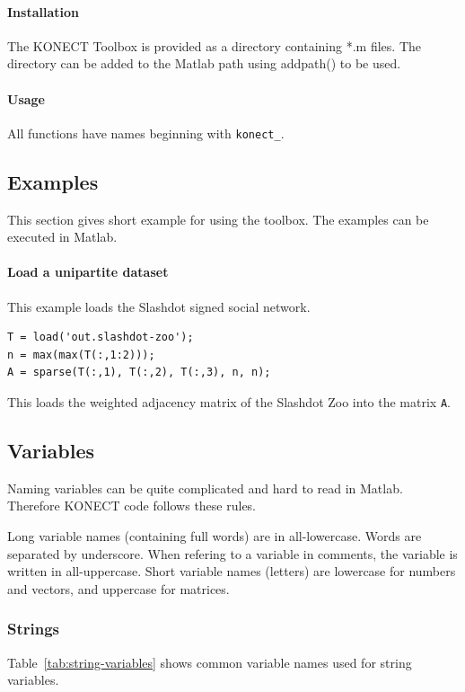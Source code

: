 \documentclass{article}
\begin{document}
\paragraph{Installation}
The KONECT Toolbox is provided as a directory containing *.m files.  The
directory can be added to the Matlab path using addpath() to be used.

\paragraph{Usage}
All functions have names beginning with \texttt{konect\_}.

\subsection{Examples}
This section gives short example for using the toolbox.  The examples
can be executed in Matlab. 

\paragraph{Load a unipartite dataset}
This example loads the Slashdot signed social network. 

\begin{verbatim}
T = load('out.slashdot-zoo');
n = max(max(T(:,1:2)));
A = sparse(T(:,1), T(:,2), T(:,3), n, n); 
\end{verbatim}

This loads the weighted adjacency matrix of the Slashdot Zoo into the
matrix \texttt{A}. 

\subsection{Variables}
Naming variables can be quite complicated and hard to read in
Matlab. Therefore KONECT code follows these rules.

Long variable names (containing full words) are in all-lowercase. Words
are separated by underscore.  When refering to a variable in comments,
the variable is written in all-uppercase.  Short variable names
(letters) are lowercase for numbers and vectors, and uppercase for
matrices.

\subsubsection{Strings}
Table~\ref{tab:string-variables} shows common variable names used for
string variables.
\end{document}
